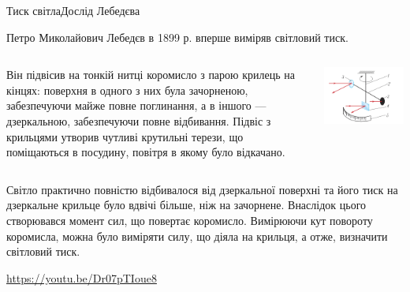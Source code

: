 \documentclass[onlytextwidth]{beamer}
\begin{document}
\begin{frame}{Тиск світла}{Дослід Лебедєва}\small
	\begin{block}{}\justifying
		Петро Миколайович Лебедєв в 1899 р. вперше виміряв світловий тиск.
	\end{block}
	\begin{columns}
		\begin{column}{0.5\linewidth}
			\begin{block}{}\justifying
				Він підвісив на тонкій нитці коромисло з парою крилець на кінцях:
				поверхня в одного з них була зачорненою, забезпечуючи майже повне поглинання, а в іншого --- дзеркальною, забезпечуючи повне відбивання.
				Підвіс з крильцями утворив чутливі крутильні терези, що поміщаються в посудину, повітря в якому було відкачано.
			\end{block}
		\end{column}
		\begin{column}{0.5\linewidth}\centering
			\includegraphics[width=\linewidth]{LebedevExp}
		\end{column}
	\end{columns}

	\begin{block}{}\justifying
		Світло практично повністю відбивалося від дзеркальної поверхні та його тиск на дзеркальне крильце було вдвічі більше, ніж на зачорнене. Внаслідок цього створювався момент сил, що повертає коромисло. Вимірюючи кут повороту коромисла, можна було виміряти силу, що діяла на крильця, а отже, визначити світловий тиск.
	\end{block}
	{\tiny \url{https://youtu.be/Dr07pTIoue8}}
\end{frame}
\end{document}
